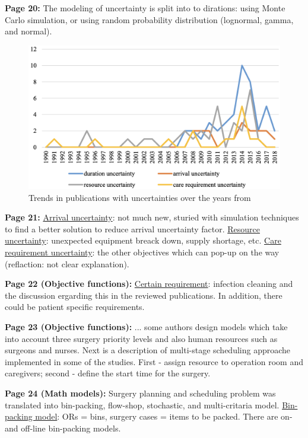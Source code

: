     \textbf{Page 20:}
    The modeling of uncertainty is split into to dirations: using Monte Carlo simulation, or using random probability distribution (lognormal, gamma, and normal).
    \begin{figure}[H]
        \centering
        \includegraphics[width=1\textwidth]{figures/SR0013CN19/fig6.png}
        \caption{Trends in publications with uncertainties over the years from \cite{x203}}
        \label{fig6:SR0013CN19}
    \end{figure}

    \textbf{Page 21:}
    \underline{Arrival uncertainty}: not much new, sturied with simulation techniques to find a better solution to reduce arrival uncertainty factor. \underline{Resource uncertainty}: unexpected equipment breack down, supply shortage, etc. \underline{Care requirement uncertainty}: the other objectives which can pop-up on the way (reflaction: not clear explanation).
    
    \textbf{Page 22 (Objective functions):}
    \underline{Certain requirement}: infection cleaning and the discussion ergarding this in the reviewed publications. In addition, there could be patient specific requirements. 
    
    \textbf{Page 23 (Objective functions):}
    ... some authors design models which take into account three surgery priority levels and also human resources such as surgeons and nurses. Next is a description of multi-stage scheduling approache implemented in some of the studies. First - assign resource to operation room and caregivers; second - define the start time for the surgery. 
    
    \textbf{Page 24 (Math models):}
    Surgery planning and scheduling problem was translated into bin-packing, flow-shop, stochastic, and multi-critaria model. \underline{Bin-packing model}: ORs = bins, surgery cases = items to be packed. There are on- and off-line bin-packing models.
    
